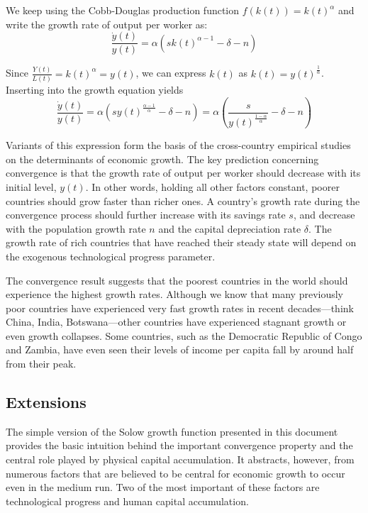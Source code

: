 \documentclass[\topdir/lecture\_notes.tex]{subfiles}
\begin{document}
We keep using the Cobb-Douglas production function \(f(k(t))=k(t)^{\alpha}\) and write the growth rate of output per worker as:
\begin{equation}
  \frac{\dot{y}(t)}{y(t)}=\alpha\left(s k(t)^{\alpha-1}-\delta-n\right)
  \label{eq:solow-convergence-growth}
\end{equation}

Since \(\frac{Y(t)}{L(t)}=k(t)^{\alpha}=y(t)\), we can express \(k(t)\) as \(k(t)=y(t)^{\frac{1}{\alpha}}\).
Inserting into the growth equation yields
\begin{equation}
  \frac{\dot{y}(t)}{y(t)}=\alpha\left(s y(t)^{\frac{\alpha-1}{\alpha}}-\delta-n\right)=\alpha\left(\frac{s}{y(t)^{\frac{1-\alpha}{\alpha}}}-\delta-n\right)
  \label{eq:solow-convergence-y}
\end{equation}

Variants of this expression form the basis of the cross-country empirical studies on the determinants of economic growth.
The key prediction concerning convergence is that the growth rate of output per worker should decrease with its initial level, \(y(t)\).
In other words, holding all other factors constant, poorer countries should grow faster than richer ones.
A country's growth rate during the convergence process should further increase with its savings rate \(s\), and decrease with the population growth rate \(n\) and the capital depreciation rate \(\delta\).
The growth rate of rich countries that have reached their steady state will depend on the exogenous technological progress parameter.

The convergence result suggests that the poorest countries in the world should experience the highest growth rates.
Although we know that many previously poor countries have experienced very fast growth rates in recent decades---think China, India, Botswana---other countries have experienced stagnant growth or even growth collapses.
Some countries, such as the Democratic Republic of Congo and Zambia, have even seen their levels of income per capita fall by around half from their peak.

\subsection{Extensions}
The simple version of the Solow growth function presented in this document provides the basic intuition behind the important convergence property and the central role played by physical capital accumulation.
It abstracts, however, from numerous factors that are believed to be central for economic growth to occur even in the medium run.
Two of the most important of these factors are technological progress and human capital accumulation.
\end{document}

